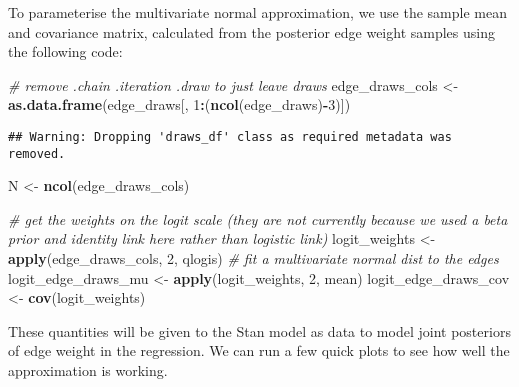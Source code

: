 \documentclass[
]{article}
\newenvironment{Shaded}{\begin{snugshade}}{\end{snugshade}}
\newcommand{\CommentTok}[1]{\textcolor[rgb]{0.56,0.35,0.01}{\textit{#1}}}
\newcommand{\DecValTok}[1]{\textcolor[rgb]{0.00,0.00,0.81}{#1}}
\newcommand{\FunctionTok}[1]{\textcolor[rgb]{0.13,0.29,0.53}{\textbf{#1}}}
\newcommand{\NormalTok}[1]{#1}
\newcommand{\OtherTok}[1]{\textcolor[rgb]{0.56,0.35,0.01}{#1}}
\newcommand{\SpecialCharTok}[1]{\textcolor[rgb]{0.81,0.36,0.00}{\textbf{#1}}}
\begin{document}
To parameterise the multivariate normal approximation, we use the sample
mean and covariance matrix, calculated from the posterior edge weight
samples using the following code:

\begin{Shaded}
\begin{Highlighting}[]
\CommentTok{\# remove .chain .iteration .draw to just leave draws}
\NormalTok{edge\_draws\_cols }\OtherTok{\textless{}{-}} \FunctionTok{as.data.frame}\NormalTok{(edge\_draws[, }\DecValTok{1}\SpecialCharTok{:}\NormalTok{(}\FunctionTok{ncol}\NormalTok{(edge\_draws)}\SpecialCharTok{{-}}\DecValTok{3}\NormalTok{)])}
\end{Highlighting}
\end{Shaded}

\begin{verbatim}
## Warning: Dropping 'draws_df' class as required metadata was removed.
\end{verbatim}

\begin{Shaded}
\begin{Highlighting}[]
\NormalTok{N }\OtherTok{\textless{}{-}} \FunctionTok{ncol}\NormalTok{(edge\_draws\_cols)}

\CommentTok{\# get the weights on the logit scale (they are not currently because we used a beta prior and identity link here rather than logistic link)}
\NormalTok{logit\_weights }\OtherTok{\textless{}{-}} \FunctionTok{apply}\NormalTok{(edge\_draws\_cols, }\DecValTok{2}\NormalTok{, qlogis)}
\CommentTok{\# fit a multivariate normal dist to the edges}
\NormalTok{logit\_edge\_draws\_mu }\OtherTok{\textless{}{-}} \FunctionTok{apply}\NormalTok{(logit\_weights, }\DecValTok{2}\NormalTok{, mean)}
\NormalTok{logit\_edge\_draws\_cov }\OtherTok{\textless{}{-}} \FunctionTok{cov}\NormalTok{(logit\_weights)}
\end{Highlighting}
\end{Shaded}

These quantities will be given to the Stan model as data to model joint
posteriors of edge weight in the regression. We can run a few quick
plots to see how well the approximation is working.
\end{document}
